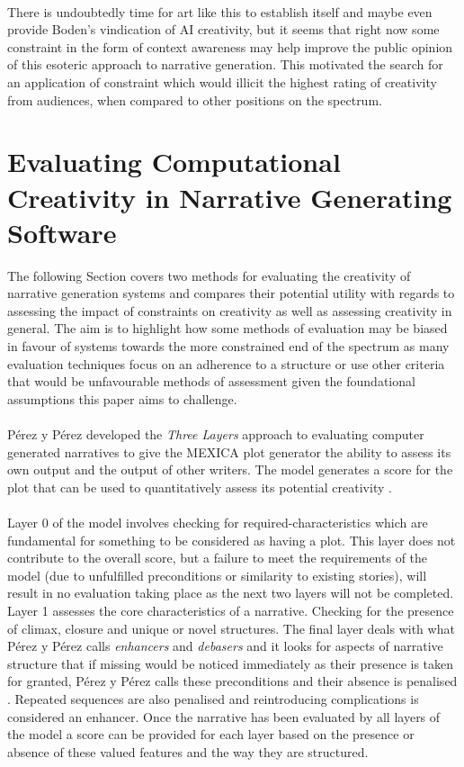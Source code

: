 \documentclass[letterpaper]{article}
\begin{document}
\\There is undoubtedly time for art like this to establish itself and maybe even provide Boden's vindication of AI creativity, but it seems that right now some constraint in the form of context awareness may help improve the public opinion of this esoteric approach to narrative generation. This motivated the search for an application of constraint which would illicit the highest rating of creativity from audiences, when compared to other positions on the spectrum.
\section{Evaluating Computational Creativity in Narrative Generating Software} \label{sec:eval}
The following Section covers two methods for evaluating the creativity of narrative generation systems and compares their potential utility with regards to assessing the impact of constraints on creativity as well as assessing creativity in general. The aim is to highlight how  some methods of evaluation may be biased in favour of systems towards the more constrained end of the spectrum as many evaluation techniques focus on an adherence to a structure or use other criteria that would be unfavourable methods of assessment given the foundational assumptions this paper aims to challenge. 
\\
\\P\'erez y P\'erez developed the \emph{Three Layers} approach to evaluating computer generated narratives to give the MEXICA plot generator the ability to assess its own output and the output of other writers. The model generates a score for the plot that can be used to quantitatively assess its potential creativity \cite{y2014three}.\\
\\Layer 0 of the model involves checking for required-characteristics  which are fundamental for something to be considered as having a plot. This layer does not contribute to the overall score, but a failure to meet the requirements of the model (due to unfulfilled preconditions or similarity to existing stories), will result in no evaluation taking place as the next two layers will not be completed. Layer 1 assesses the core characteristics of a narrative. Checking for the presence of climax, closure and unique or novel structures. The final layer deals with what P\'erez y P\'erez calls \emph{enhancers} and \emph{debasers} and it looks for aspects of narrative structure that if missing would be noticed immediately as their presence is taken for granted, P\'erez y P\'erez calls these preconditions and their absence is  penalised \cite{y2014three}. Repeated sequences are also penalised and reintroducing complications is considered an enhancer. Once the narrative has been evaluated by all layers of the model a score can be provided for each layer based on the presence or absence of these valued features and the way they are structured.\\
\end{document}
